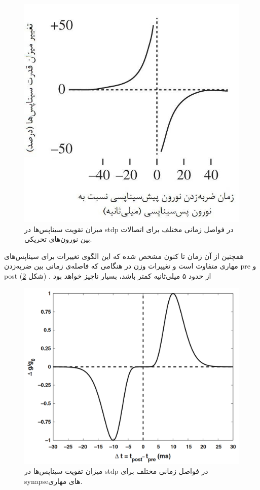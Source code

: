 \documentclass[12pt]{report}
\begin{document}
	
	\begin{figure}[H]
		\centering
		\includegraphics[width=0.7\linewidth]{stdp.jpg}
		\caption[NS]{
			میزان تقویت سیناپس‌ها در \gls{stdp} در فواصل زمانی مختلف برای اتصالات بین نورون‌های تحریکی.
		}
		\label{fig:stdp}
	\end{figure}

	همچنین از آن زمان تا کنون مشخص شده که این الگوی تغییرات برای سیناپس‌های مهاری متفاوت است و تغییرات وزن در هنگامی که فاصله‌ی زمانی بین ضربه‌زدن \gls{pre} و \gls{post} از حدود ۵ میلی‌ثانیه کمتر باشد، بسیار ناچیز خواهد بود \cite{Haas2006}. (شکل \ref{fig:stdp-inh})
	
	\begin{figure}[H]
		\centering
		\includegraphics[width=0.7\linewidth]{stdp-inh.png}
		\caption[NS]{
			میزان تقویت سیناپس‌ها در \gls{stdp} در فواصل زمانی مختلف برای \gls{synapse}‌های مهاری.
		}
		\label{fig:stdp-inh}
	\end{figure}
	
\end{document}

